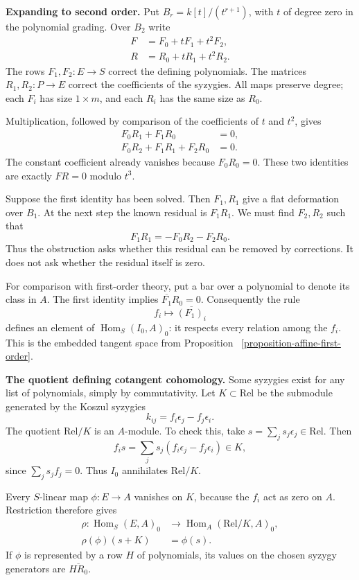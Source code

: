 \medskip\noindent
\textbf{Expanding to second order.}
Put $B_r=k[t]/(t^{r+1})$, with $t$ of
degree zero in the polynomial grading.
Over $B_2$ write
$$
\begin{aligned}
F&=F_0+tF_1+t^2F_2,\\
R&=R_0+tR_1+t^2R_2.
\end{aligned}
$$
The rows $F_1,F_2:E\to S$ correct the
defining polynomials. The matrices
$R_1,R_2:P\to E$ correct the coefficients
of the syzygies. All maps preserve degree;
each $F_i$ has size $1\times m$, and each
$R_i$ has the same size as $R_0$.

Multiplication, followed by comparison of
the coefficients of $t$ and $t^2$, gives
\begin{equation}
\label{equation-syzygy-lifts}
\begin{aligned}
F_0R_1+F_1R_0&=0,\\
F_0R_2+F_1R_1+F_2R_0&=0.
\end{aligned}
\end{equation}
The constant coefficient already vanishes
because $F_0R_0=0$. These two identities
are exactly $FR=0$ modulo $t^3$.

Suppose the first identity has been solved.
Then $F_1,R_1$ give a flat deformation over
$B_1$. At the next step the known residual
is $F_1R_1$. We must find $F_2,R_2$ such
that
$$
F_1R_1=-F_0R_2-F_2R_0.
$$
Thus the obstruction asks whether this
residual can be removed by corrections.
It does not ask whether the residual
itself is zero.

For comparison with first-order theory,
put a bar over a polynomial to denote its
class in $A$. The first identity implies
$\overline{F_1}R_0=0$. Consequently the rule
$$
f_i\longmapsto\overline{(F_1)_i}
$$
defines an element of
$\operatorname{Hom}_S(I_0,A)_0$:
it respects every relation among the
$f_i$. This is the embedded tangent space
from
Proposition~%
\ref{proposition-affine-first-order}.

\medskip\noindent
\textbf{The quotient defining cotangent
cohomology.}
Some syzygies exist for any list of
polynomials, simply by commutativity. Let
$K\subset\mathrm{Rel}$ be the submodule
generated by the Koszul syzygies
$$
k_{ij}=f_i\epsilon_j-f_j\epsilon_i.
$$
The quotient $\mathrm{Rel}/K$ is an
$A$-module. To check this, take
$s=\sum_j s_j\epsilon_j\in\mathrm{Rel}$.
Then
$$
f_i s=\sum_j s_j
(f_i\epsilon_j-f_j\epsilon_i)\in K,
$$
since $\sum_j s_jf_j=0$. Thus $I_0$
annihilates $\mathrm{Rel}/K$.

Every $S$-linear map $\phi:E\to A$
vanishes on $K$, because the $f_i$ act as
zero on $A$. Restriction therefore gives
$$
\begin{aligned}
\rho:\operatorname{Hom}_S(E,A)_0
&\longrightarrow
\operatorname{Hom}_A(\mathrm{Rel}/K,A)_0,\\
\rho(\phi)(s+K)&=\phi(s).
\end{aligned}
$$
If $\phi$ is represented by a row $H$ of
polynomials, its values on the chosen
syzygy generators are $\overline{H R_0}$.

